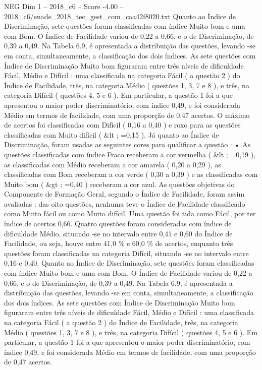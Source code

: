 \begin{textsample}{NEG Dim 1 – 2018\_c6 – Score -4.00 – 2018\_c6/enade\_2018\_tec\_gest\_com\_caa42f8020.txt}
Quanto ao Índice de Discriminação, sete questões foram classificadas com índice Muito bom e uma com Bom.
O Índice de Facilidade variou de 0,22 a 0,66, e o de Discriminação, de 0,39 a 0,49.
Na Tabela 6.9, é apresentada a distribuição das questões, levando -se em conta, simultaneamente, a classificação dos dois índices.
As sete questões com Índice de Discriminação Muito bom figuraram entre três níveis de dificuldade Fácil, Médio e Difícil : uma classificada na categoria Fácil ( a questão 2 ) do Índice de Facilidade, três, na categoria Médio ( questões 1, 3, 7 e 8 ), e três, na categoria Difícil ( questões 4, 5 e 6 ).
Em particular, a questão 1 foi a que apresentou o maior poder discriminatório, com índice 0,49, e foi considerada Médio em termos de facilidade, com uma proporção de 0,47 acertos.
O máximo de acertos foi classificadas com Difícil ( 0,16 a 0,40 ) e roxo para as questões classificadas com Muito difícil ( \&lt ; =0,15 ).
Já quanto ao Índice de Discriminação, foram usadas as seguintes cores para qualificar a questão : • As questões classificadas com índice Fraco receberam a cor vermelha ( \&lt ; =0,19 ), as classificadas com Médio receberam a cor amarela ( 0,20 a 0,29 ), as classificadas com Bom receberam a cor verde ( 0,30 a 0,39 ) e as classificadas com Muito bom ( \&gt ; =0,40 ) receberam a cor azul.
As questões objetivas do Componente de Formação Geral, segundo o Índice de Facilidade, foram assim avaliadas : das oito questões, nenhuma teve o Índice de Facilidade classificado como Muito fácil ou como Muito difícil.
Uma questão foi tida como Fácil, por ter índice de acertos 0,66.
Quatro questões foram consideradas com índice de dificuldade Médio, situando -se no intervalo entre 0,41 e 0,60 do Índice de Facilidade, ou seja, houve entre 41,0 \% e 60,0 \% de acertos, enquanto três questões foram classificadas na categoria Difícil, situando -se no intervalo entre 0,16 e 0,40.
Quanto ao Índice de Discriminação, sete questões foram classificadas com índice Muito bom e uma com Bom.
O Índice de Facilidade variou de 0,22 a 0,66, e o de Discriminação, de 0,39 a 0,49.
Na Tabela 6.9, é apresentada a distribuição das questões, levando -se em conta, simultaneamente, a classificação dos dois índices.
As sete questões com Índice de Discriminação Muito bom figuraram entre três níveis de dificuldade Fácil, Médio e Difícil : uma classificada na categoria Fácil ( a questão 2 ) do Índice de Facilidade, três, na categoria Médio ( questões 1, 3, 7 e 8 ), e três, na categoria Difícil ( questões 4, 5 e 6 ).
Em particular, a questão 1 foi a que apresentou o maior poder discriminatório, com índice 0,49, e foi considerada Médio em termos de facilidade, com uma proporção de 0,47 acertos.

\end{textsample}
